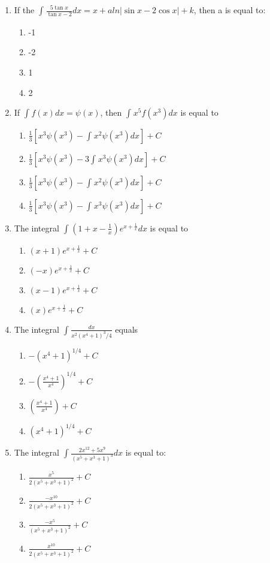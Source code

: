 \begin{enumerate}[label=\arabic*.,ref=\thesubsection.\theenumi]
\item If the $\int_{}\frac{5\tan x}{\tan x - 2}dx = x + aln|\sin x - 2\cos x| + k$, then a is equal to:
\begin{enumerate}
\item -1
\item -2
\item 1
\item 2
\end{enumerate}

\item If $\int_{}f(x)dx = \psi(x)$, then $\int_{}x^5f(x^3)dx$ is equal to
\begin{enumerate}
\item $\frac{1}{3}[x^3\psi(x^3) - \int_{}x^2\psi(x^3)dx] + C$
\item $\frac{1}{3}[x^3\psi(x^3) - 3\int_{}x^3\psi(x^3)dx] + C$
\item $\frac{1}{3}[x^3\psi(x^3) - \int_{}x^2\psi(x^3)dx] + C$
\item $\frac{1}{3}[x^3\psi(x^3) - \int_{}x^3\psi(x^3)dx] + C$
\end{enumerate}

\item The integral $\int_{}(1 + x -\frac{1}{x})e^{x + \frac{1}{x}}dx$ is equal to
\begin{enumerate}
\item $(x + 1)e^{x + \frac{1}{x}} + C$
\item $(-x)e^{x + \frac{1}{x}} + C$
\item $(x - 1)e^{x + \frac{1}{x}} + C$
\item $(x)e^{x + \frac{1}{x}} + C$
\end{enumerate}

\item The integral $\int_{}\frac{dx}{x^2(x^4 + 1)^3/4}$ equals
\begin{enumerate}
\item $-(x^4 + 1)^{1/4} + C$
\item $-(\frac{x^4 + 1}{x^4})^{1/4} + C$
\item $(\frac{x^4 + 1}{x^4}) + C$
\item $(x^4 + 1)^{1/4} + C$
\end{enumerate}

\item The integral $\int_{}\frac{2x^{12} + 5x^9}{(x^5 + x^3 + 1)^3}dx$ is equal to:
\begin{enumerate}
\item $\frac{x^5}{2(x^5 + x^3 + 1)^2} + C$
\item $\frac{-x^{10}}{2(x^5 + x^3 + 1)^2} + C$
\item $\frac{-x^5}{(x^5 + x^3 + 1)^2} + C$
\item $\frac{x^{10}}{2(x^5 + x^3 + 1)^2} + C$
\end{enumerate}


\end{enumerate}
